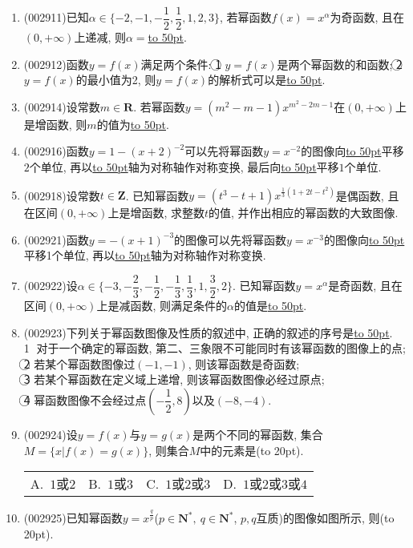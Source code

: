 \documentclass[10pt,a4paper]{article}
\newcommand{\blank}[1]{\underline{\hbox to #1pt{}}}
\newcommand{\bracket}[1]{(\hbox to #1pt{})}
\newcommand{\fourch}[4]{\par\begin{tabular}{p{.23\textwidth}p{.23\textwidth}p{.23\textwidth}p{.23\textwidth}}
A.~#1 &B.~#2& C.~#3& D.~#4
\end{tabular}}
\begin{document}
\begin{enumerate}[1.]
\begin{center}
    \end{center}
\fourch{$-2,-\dfrac 12,\dfrac 12,2$}{$2,\dfrac 12,-\dfrac 12,-2$
}{$-\dfrac 12,-2,2,\dfrac 12$}{$2,\dfrac 12,-2,-\dfrac 12$}
\item {\tiny (002911)}已知$\alpha\in \{-2,-1,-\dfrac 12,\dfrac 12,1,2,3\}$, 若幂函数$f(x)=x^\alpha$为奇函数, 且在$(0,+\infty)$上递减, 则$\alpha=$\blank{50}.
\item {\tiny (002912)}函数$y=f(x)$满足两个条件:
\textcircled{1} $y=f(x)$是两个幂函数的和函数; \textcircled{2} $y=f(x)$的最小值为2, 则$y=f(x)$的解析式可以是\blank{50}.
\item {\tiny (002914)}设常数$m\in \mathbf{R}$. 若幂函数$y=(m^2-m-1)x^{m^2-2m-1}$在$(0,+\infty)$上是增函数, 则$m$的值为\blank{50}.
\item {\tiny (002916)}函数$y=1-(x+2)^{-2}$可以先将幂函数$y=x^{-2}$的图像向\blank{50}平移$2$个单位, 再以\blank{50}轴为对称轴作对称变换, 最后向\blank{50}平移$1$个单位.
\item {\tiny (002918)}设常数$t\in \mathbf{Z}$. 已知幂函数$y=(t^3-t+1){x^{\frac 13(1+2t-t^2)}}$是偶函数, 且在区间$(0,+\infty)$上是增函数, 求整数$t$的值, 并作出相应的幂函数的大致图像.
\item {\tiny (002921)}函数$y=-(x+1)^{-3}$的图像可以先将幂函数$y=x^{-3}$的图像向\blank{50}平移1个单位, 再以\blank{50}轴为对称轴作对称变换.
\item {\tiny (002922)}设$\alpha \in \{-3,-\dfrac 23,-\dfrac 12,-\dfrac 13,\dfrac 13,1,\dfrac 32,2\}$. 已知幂函数$y=x^{\alpha}$是奇函数, 且在区间$(0,+\infty)$上是减函数, 则满足条件的$\alpha$的值是\blank{50}.
\item {\tiny (002923)}下列关于幂函数图像及性质的叙述中, 正确的叙述的序号是\blank{50}.\\
\textcircled{1} 对于一个确定的幂函数, 第二、三象限不可能同时有该幂函数的图像上的点;\\
\textcircled{2} 若某个幂函数图像过$(-1,-1)$, 则该幂函数是奇函数;\\
\textcircled{3} 若某个幂函数在定义域上递增, 则该幂函数图像必经过原点;\\
\textcircled{4} 幂函数图像不会经过点$(-\dfrac 12,8)$以及$(-8,-4)$.
\item {\tiny (002924)}设$y=f(x)$与$y=g(x)$是两个不同的幂函数, 集合$M=\{x|f(x)=g(x)  \}$, 则集合$M$中的元素是\bracket{20}.
\fourch{$1$或$2$}{$1$或$3$}{$1$或$2$或$3$}{$1$或$2$或$3$或$4$}
\item {\tiny (002925)}已知幂函数$y=x^{\frac qp}$($p\in \mathbf{N}^*,\ q\in \mathbf{N}^*$, $p,q$互质)的图像如图所示, 则\bracket{20}.

\end{enumerate}
\end{document}
